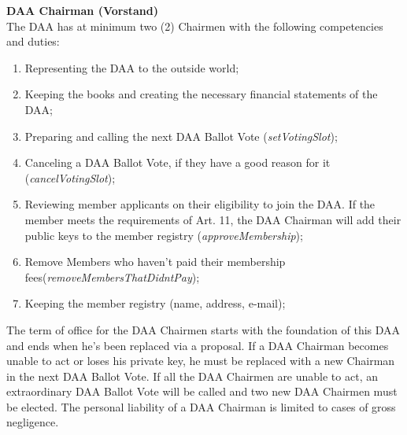 \item \textbf{DAA Chairman (Vorstand)} \\
The DAA has at minimum two (2) Chairmen with the following competencies and duties:
\begin{enumerate}
[label=(\alph*)]
    \item Representing the DAA to the outside world;
    \item Keeping the books and creating the necessary financial statements of the DAA;
    \item Preparing and calling the next DAA Ballot Vote (\emph{setVotingSlot});
    \item Canceling a DAA Ballot Vote, if they have a good reason for it (\emph{cancelVotingSlot});
    \item Reviewing member applicants on their eligibility to join the DAA.
    If the member meets the requirements of Art. 11, the DAA Chairman will add their public keys to the member registry (\emph{approveMembership});
    \item Remove Members who haven't paid their membership fees(\emph{removeMembersThatDidntPay});
    \item Keeping the member registry (name, address, e-mail);
\end{enumerate}
The term of office for the DAA Chairmen starts with the foundation of this DAA and ends when he's been replaced via a proposal.
If a DAA Chairman becomes unable to act or loses his private key, he must be replaced with a new Chairman in the next DAA Ballot Vote.
If all the DAA Chairmen are unable to act, an extraordinary DAA Ballot Vote will be called and two new DAA Chairmen must be elected.
The personal liability of a DAA Chairman is limited to cases of gross negligence.

